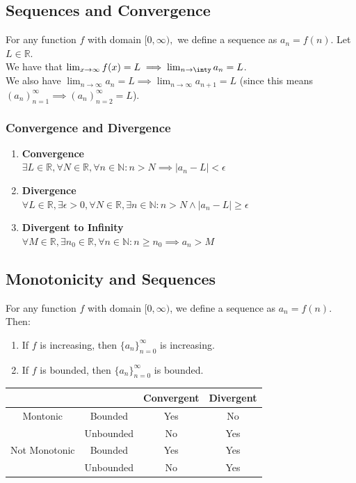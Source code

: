 \documentclass{article}
\begin{document}
\subsection{Sequences and Convergence}
For any function $f$ with domain $[0, \infty),$ we define a sequence as $a_n = f(n)$. Let $L \in \mathbb{R}$.\\
We have that $\lim_{x\to\infty} f(x) = L \implies \lim_{n\to \inty}a_n = L$.\\
We also have $\lim_{n\to\infty} a_n = L \implies \lim_{n\to\infty}a_{n+1} = L$ (since this means $(a_n)_{n=1}^\infty \implies (a_n)_{n=2}^\infty = L$).

\subsubsection{Convergence and Divergence}
\begin{enumerate}
    \item \textbf{Convergence}\\
    $\exists L \in \mathbb{R}, \forall N \in \mathbb{R}, \forall n \in \mathbb{N} : n > N \implies |a_n - L| < \epsilon$
    
    \item \textbf{Divergence}\\
    $\forall L \in \mathbb{R}, \exists \epsilon > 0, \forall N \in \mathbb{R}, \exists n \in \mathbb{N} : n > N \land |a_n - L| \geq \epsilon$
    
    \item \textbf{Divergent to Infinity}\\
    $\forall M \in \mathbb{R}, \exists n_0 \in \mathbb{R}, \forall n \in \mathbb{N} : n \geq n_0 \implies a_n > M$
\end{enumerate}

\subsection{Monotonicity and Sequences}
For any function $f$ with domain $[0, \infty)$, we define a sequence as $a_n = f(n)$. Then:
\begin{enumerate}
    \item If $f$ is increasing, then $\{a_n\}_{n=0}^\infty$ is increasing.
    \item If $f$ is bounded, then $\{a_n\}_{n=0}^\infty$ is bounded.
\end{enumerate}

\begin{center}
    \begin{tabular}{|c|c|c|c|}
        \hline
         & & Convergent & Divergent\\
         \hline
         Montonic & Bounded & Yes & No\\
         \cline{2-4}
         & Unbounded & No & Yes\\
         \hline
         Not Monotonic & Bounded & Yes & Yes\\
         \cline{2-4}
         & Unbounded & No & Yes\\
         \hline
    \end{tabular}
\end{center}
\end{document}
